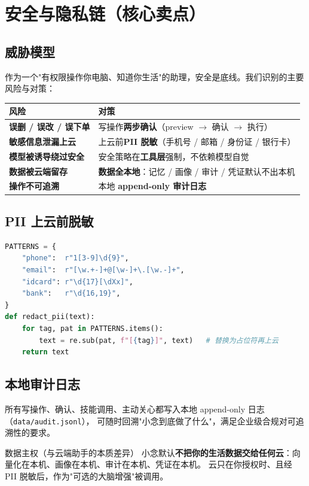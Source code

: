 \chapter{安全与隐私链（核心卖点）}

\section{威胁模型}
作为一个"有权限操作你电脑、知道你生活"的助理，安全是底线。我们识别的主要风险与对策：

\begin{center}
\small
\begin{tabularx}{\linewidth}{>{\bfseries}p{3.4cm} X}
\toprule
风险 & 对策 \\
\midrule
误删 / 误改 / 误下单 & 写操作\textbf{两步确认}（preview $\to$ 确认 $\to$ 执行） \\
敏感信息泄漏上云 & 上云前\textbf{PII 脱敏}（手机号 / 邮箱 / 身份证 / 银行卡） \\
模型被诱导绕过安全 & 安全策略在\textbf{工具层}强制，不依赖模型自觉 \\
数据被云端留存 & \textbf{数据全本地}：记忆 / 画像 / 审计 / 凭证默认不出本机 \\
操作不可追溯 & 本地 \textbf{append-only 审计日志} \\
\bottomrule
\end{tabularx}
\end{center}

\section{PII 上云前脱敏}
\begin{lstlisting}[language=Python,caption={PII 脱敏（security/redact.py 摘选）}]
PATTERNS = {
    "phone":  r"1[3-9]\d{9}",
    "email":  r"[\w.+-]+@[\w-]+\.[\w.-]+",
    "idcard": r"\d{17}[\dXx]",
    "bank":   r"\d{16,19}",
}
def redact_pii(text):
    for tag, pat in PATTERNS.items():
        text = re.sub(pat, f"[{tag}]", text)   # 替换为占位符再上云
    return text
\end{lstlisting}

\section{本地审计日志}
所有写操作、确认、技能调用、主动关心都写入本地 append-only 日志（\texttt{data/audit.jsonl}），
可随时回溯"小念到底做了什么"，满足企业级合规对可追溯性的要求。

\begin{goodbox}{数据主权（与云端助手的本质差异）}
小念默认\textbf{不把你的生活数据交给任何云}：向量化在本机、画像在本机、审计在本机、凭证在本机。
云只在你授权时、且经 PII 脱敏后，作为"可选的大脑增强"被调用。
\end{goodbox}


